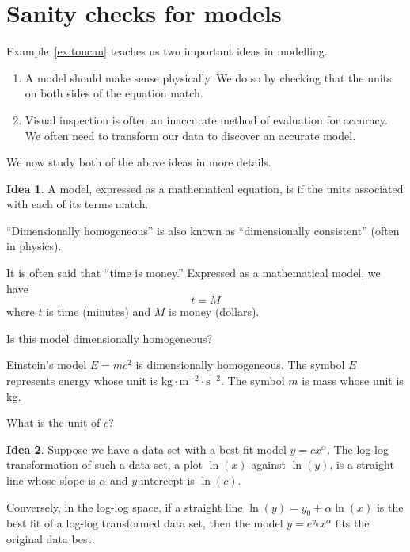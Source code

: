 \documentclass[../main.tex]{subfiles}
\begin{document}
 \section{Sanity checks for models}
Example~\ref{ex:toucan} teaches us two important ideas in modelling.
\begin{enumerate}
  \item A model should make sense physically. We do so by checking that the units on both sides of the equation match.

  \item Visual inspection is often an inaccurate method of evaluation for accuracy. We often need to transform our data to discover an accurate model.
\end{enumerate}

We now study both of the above ideas in more details.

\begin{mdframed}[style=simple]
  \textbf{Idea 1}. A model, expressed as a mathematical equation, is  if the units associated with each of its terms match.
\end{mdframed}
\faPencil*{} ``Dimensionally homogeneous'' is also known as ``dimensionally consistent'' (often in physics).

\begin{example}
  It is often said that ``time is money.'' Expressed as a mathematical model, we have 
  \[
    t = M
  \]
  where \(t\) is time (minutes) and \(M\) is money (dollars).

  Is this model dimensionally homogeneous?
\end{example}

\begin{example}
  Einstein's model \(E = mc^{2}\) is dimensionally homogeneous. The symbol \(E\) represents energy whose unit is \(\text{kg} \cdot \text{m}^{-2} \cdot \text{s}^{-2}\). The symbol \(m\) is mass whose unit is kg. 

  What is the unit of \(c\)?
\end{example}
\clearpage


\begin{mdframed}[style=simple]
  \textbf{Idea 2}. Suppose we have a data set with a best-fit model \(y = c x^{\alpha}\). 
  The log-log transformation of such a data set, a plot \(\ln(x)\) against \(\ln(y)\), is a straight line whose slope is \(\alpha\) and \(y\)-intercept is \(\ln(c)\).

  Conversely, in the log-log space, if a straight line \(\ln(y) = y_{0} + \alpha \ln(x)\) is the best fit of a log-log transformed data set, then the model \(y = e^{y_{0}} x^{\alpha}\) fits the original data best.
\end{mdframed}
\end{document}
